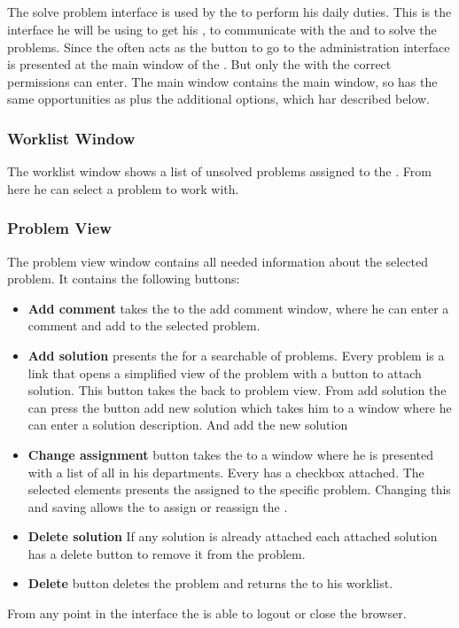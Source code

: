 
\subsection{\sinterface}

The solve problem interface is used by the \astaff[] to perform his daily duties. This is the interface he will be using to get his \todolist{}, to communicate with the \aclient{} and to solve the problems.
Since the \astaff{} often acts as \sadmin{} the button to go to the administration interface is presented at the main window of the \spinterface{}.
But only the \astaff{} with the correct permissions can enter.
The main window contains the \client{} main window, so \astaff{} has the same opportunities as \aclient{} plus the additional options, which har described below.


\subsubsection{Worklist Window}
The worklist window shows a list of unsolved problems assigned to the \astaff. From here he can select a problem to work with. 

\subsubsection{Problem View}
The problem view window contains all needed information about the selected problem. It contains the following buttons: 
\begin{itemize}
\item \textbf{Add comment}  takes the \astaff{} to the add comment window, where he can enter a comment and add to the selected problem. 

\item \textbf{Add solution} presents the \astaff{} for a searchable of problems. Every problem is a link that opens a simplified view of the problem with a button to attach solution. This button takes the \astaff{} back to problem view. From add solution the \astaff{} can press the button add new solution which takes him to a window where he can enter a solution description.
And add the new solution 

\item \textbf{Change assignment} button takes the \astaff{} to a window where he is presented with a list of all \staff{} in his departments. Every \staff{} has a checkbox attached. The selected elements presents the \staff{} assigned to the specific problem. Changing this and saving allows the \astaff{} to assign or reassign the \astaff{}. 

\item \textbf{Delete solution} If any solution is already attached each attached solution has a delete button to remove it from the problem. 

\item \textbf{Delete} button deletes the problem and returns the \staff{} to his worklist.

\end{itemize}
From any point in the interface the \astaff{} is able to logout or close the browser. 



